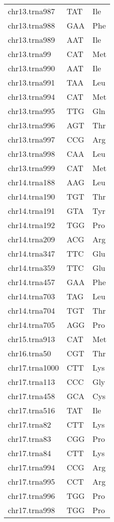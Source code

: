 \begin{longtable}{@{}l>{\collectcell\anticodon}l<{\endcollectcell}l@{}}
    chr13.trna987 & TAT & Ile \\
    chr13.trna988 & GAA & Phe \\
    chr13.trna989 & AAT & Ile \\
    chr13.trna99 & CAT & Met \\
    chr13.trna990 & AAT & Ile \\
    chr13.trna991 & TAA & Leu \\
    chr13.trna994 & CAT & Met \\
    chr13.trna995 & TTG & Gln \\
    chr13.trna996 & AGT & Thr \\
    chr13.trna997 & CCG & Arg \\
    chr13.trna998 & CAA & Leu \\
    chr13.trna999 & CAT & Met \\
    chr14.trna188 & AAG & Leu \\
    chr14.trna190 & TGT & Thr \\
    chr14.trna191 & GTA & Tyr \\
    chr14.trna192 & TGG & Pro \\
    chr14.trna209 & ACG & Arg \\
    chr14.trna347 & TTC & Glu \\
    chr14.trna359 & TTC & Glu \\
    chr14.trna457 & GAA & Phe \\
    chr14.trna703 & TAG & Leu \\
    chr14.trna704 & TGT & Thr \\
    chr14.trna705 & AGG & Pro \\
    chr15.trna913 & CAT & Met \\
    chr16.trna50 & CGT & Thr \\
    chr17.trna1000 & CTT & Lys \\
    chr17.trna113 & CCC & Gly \\
    chr17.trna458 & GCA & Cys \\
    chr17.trna516 & TAT & Ile \\
    chr17.trna82 & CTT & Lys \\
    chr17.trna83 & CGG & Pro \\
    chr17.trna84 & CTT & Lys \\
    chr17.trna994 & CCG & Arg \\
    chr17.trna995 & CCT & Arg \\
    chr17.trna996 & TGG & Pro \\
    chr17.trna998 & TGG & Pro \\

\end{longtable}
